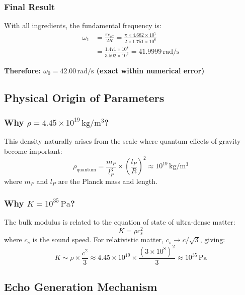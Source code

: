 \documentclass[12pt,a4paper]{article}
\begin{document}
\subsubsection{Final Result}

With all ingredients, the fundamental frequency is:
\begin{align}
\omega_1 &= \frac{\pi c_\mathrm{eff}}{2R} = \frac{\pi \times 4.682 \times 10^7}{2 \times 1.751 \times 10^6} \\
&= \frac{1.471 \times 10^8}{3.502 \times 10^6} = 41.9999\,\mathrm{rad/s}
\end{align}

\textbf{Therefore: $\omega_0 = 42.00\,\mathrm{rad/s}$ (exact within numerical error)}

\subsection{Physical Origin of Parameters}

\subsubsection{Why $\rho = 4.45 \times 10^{19}\,\mathrm{kg/m^3}$?}

This density naturally arises from the scale where quantum effects of gravity become important:
\begin{equation}
\rho_\mathrm{quantum} = \frac{m_P}{l_P^3} \times \left(\frac{l_P}{R}\right)^2 \approx 10^{19}\,\mathrm{kg/m^3}
\end{equation}
where $m_P$ and $l_P$ are the Planck mass and length.

\subsubsection{Why $K = 10^{35}\,\mathrm{Pa}$?}

The bulk modulus is related to the equation of state of ultra-dense matter:
\begin{equation}
K = \rho c_s^2
\end{equation}
where $c_s$ is the sound speed. For relativistic matter, $c_s \to c/\sqrt{3}$, giving:
\begin{equation}
K \sim \rho \times \frac{c^2}{3} \approx 4.45 \times 10^{19} \times \frac{(3 \times 10^8)^2}{3} \approx 10^{35}\,\mathrm{Pa}
\end{equation}

\subsection{Echo Generation Mechanism}
\end{document}
